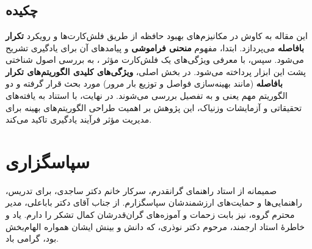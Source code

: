 \documentclass[12pt]{report}
\begin{document}
\chapter*{}

\section*{چکیده}
این مقاله به کاوش در مکانیزم‌های بهبود حافظه از طریق 
فلش‌کارت‌ها و رویکرد \textbf{تکرار بافاصله} می‌پردازد. 
ابتدا، مفهوم \textbf{منحنی فراموشی} و پیامدهای 
آن برای یادگیری تشریح می‌شود. سپس، با معرفی 
ویژگی‌های یک فلش‌کارت مؤثر ، به بررسی اصول 
شناختی پشت این ابزار پرداخته می‌شود. در بخش 
اصلی، \textbf{ویژگی‌های کلیدی الگوریتم‌های تکرار بافاصله} 
(مانند بهینه‌سازی فواصل و توزیع بار مرور) 
مورد بحث قرار گرفته و دو الگوریتم مهم 
یعنی  و  به تفصیل بررسی می‌شوند.
در نهایت، با استناد به یافته‌های تحقیقاتی و آزمایشات وزنیاک، این پژوهش بر اهمیت طراحی الگوریتم‌های بهینه برای مدیریت مؤثر فرآیند یادگیری تاکید می‌کند.


\chapter*{سپاسگزاری}
صمیمانه از استاد راهنمای گرانقدرم، سرکار خانم دکتر ساجدی، برای تدریس، راهنمایی‌ها و‌ حمایت‌های ارزشمندشان سپاسگزارم. از جناب آقای دکتر باباعلی، مدیر محترم گروه، نیز بابت زحمات و آموزه‌های گران‌قدرشان کمال تشکر را دارم. یاد و خاطرهٔ استاد ارجمند، مرحوم دکتر نوذری، که دانش و بینش ایشان همواره الهام‌بخش بود، گرامی باد.
\end{document}
